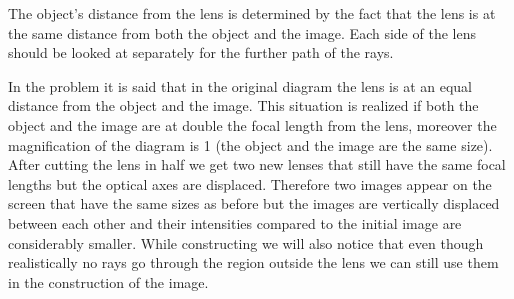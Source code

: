 \hinteng
The object's distance from the lens is determined by the fact that the lens is at the same distance from both the object and the image. Each side of the lens should be looked at separately for the further path of the rays.

\solueng
In the problem it is said that in the original diagram the lens is at an equal distance from the object and the image. This situation is realized if both the object and the image are at double the focal length from the lens, moreover the magnification of the diagram is 1 (the object and the image are the same size). After cutting the lens in half we get two new lenses that still have the same focal lengths but the optical axes are displaced. Therefore two images appear on the screen that have the same sizes as before but the images are vertically displaced between each other and their intensities compared to the initial image are considerably smaller. While constructing we will also notice that even though realistically no rays go through the region outside the lens we can still use them in the construction of the image.
\begin{center}

\end{center}
\probend